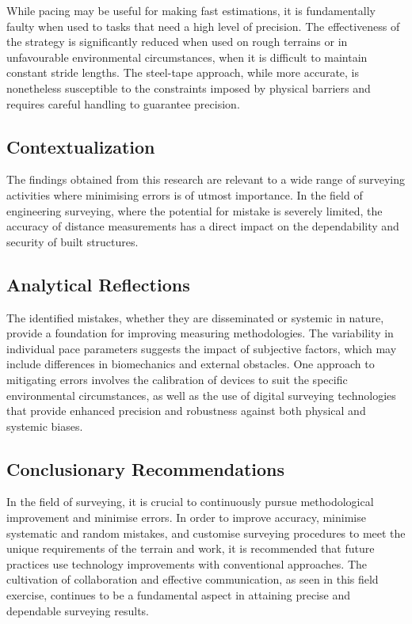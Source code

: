 \documentclass[12pt]{article}
\begin{document}
While pacing may be useful for making fast estimations, it is fundamentally faulty when used to tasks that need a high level of precision. The effectiveness of the strategy is significantly reduced when used on rough terrains or in unfavourable environmental circumstances, when it is difficult to maintain constant stride lengths. The steel-tape approach, while more accurate, is nonetheless susceptible to the constraints imposed by physical barriers and requires careful handling to guarantee precision.

\subsection*{Contextualization}

The findings obtained from this research are relevant to a wide range of surveying activities where minimising errors is of utmost importance. In the field of engineering surveying, where the potential for mistake is severely limited, the accuracy of distance measurements has a direct impact on the dependability and security of built structures.

\subsection*{Analytical Reflections}

The identified mistakes, whether they are disseminated or systemic in nature, provide a foundation for improving measuring methodologies. The variability in individual pace parameters suggests the impact of subjective factors, which may include differences in biomechanics and external obstacles. One approach to mitigating errors involves the calibration of devices to suit the specific environmental circumstances, as well as the use of digital surveying technologies that provide enhanced precision and robustness against both physical and systemic biases.

\subsection*{Conclusionary Recommendations}

In the field of surveying, it is crucial to continuously pursue methodological improvement and minimise errors. In order to improve accuracy, minimise systematic and random mistakes, and customise surveying procedures to meet the unique requirements of the terrain and work, it is recommended that future practices use technology improvements with conventional approaches. The cultivation of collaboration and effective communication, as seen in this field exercise, continues to be a fundamental aspect in attaining precise and dependable surveying results.
\end{document}
